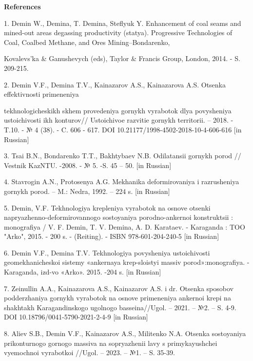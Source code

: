 \begin{center}
{\bfseries References}
\end{center}

\begin{noparindent}
1. Demin W., Demina, T. Demina, Steflyuk Y. Enhancement of coal seams
and mined-out areas degassing productivity (stat\textquotesingle ya).
Progressive Technologies of Coal, Coalbed Methane, and Ores
Mining--Bondarenko,

Kovalevs'ka \& Ganushevych (eds), Taylor \& Francis
Group, London, 2014. - S. 209-215.

2. Demin V.F., Demina T.V., Kainazarov A.S., Kainazarova A.S. Otsenka
effektivnosti primeneniya

tekhnologicheskikh skhem provedeniya gornykh
vyrabotok dlya povysheniya ustoichivosti ikh konturov// Ustoichivoe
razvitie gornykh territorii. -- 2018. - T.10. - № 4 (38). - C. 606 -
617. DOI 10.21177/1998-4502-2018-10-4-606-616 {[}in Russian{]}

3. Tsai B.N., Bondarenko T.T., Bakhtybaev N.B. Odilatansii gornykh porod
// Vestnik KazNTU. -2008. - № 5. -S. 45 -- 50. {[}in Russian{]}

4. Stavrogin A.N., Protosenya A.G. Mekhanika deformirovaniya i
razrusheniya gornykh porod. -- M.: Nedra, 1992. -- 224 s. {[}in
Russian{]}

5. Demin, V.F. Tekhnologiya krepleniya vyrabotok na osnove otsenki
napryazhenno-deformirovannogo sostoyaniya porodno-ankernoi konstruktsii
: monografiya / V. F. Demin, T. V. Demina, A. D. Karataev. - Karaganda :
TOO "Arko", 2015. - 200 s. - (Reiting). - ISBN 978-601-204-240-5 {[}in
Russian{]}

6. Demin V.F., Demina T.V. Tekhnologiya povysheniya ustoichivosti
geomekhanicheskoi sistemy «ankernaya krep\textquotesingle-sloistyi
massiv porod»:monografiya. -Karaganda, izd-vo «Arko». 2015. -204 s.
{[}in Russian{]}

7. Zeinullin A.A., Kainazarova A.S., Kainazarov A.S. i dr. Otsenka
sposobov podderzhaniya gornykh vyrabotok na osnove primeneniya ankernoi
krepi na shakhtakh Karagandinskogo ugol\textquotesingle nogo
basseina//Ugol\textquotesingle. -- 2021. -- №2. -- S. 4-9. DOI
10.18796/0041-5790-2021-2-4-9 {[}in Russian{]}

8. Aliev S.B., Demin V.F., Kainazarov A.S., Militenko N.A. Otsenka
sostoyaniya prikonturnogo gornogo massiva na sopryazhenii lavy s
primykayushchei vyemochnoi vyrabotkoi //Ugol\textquotesingle. -- 2023.
-- №1. -- S. 35-39.


\end{noparindent}
